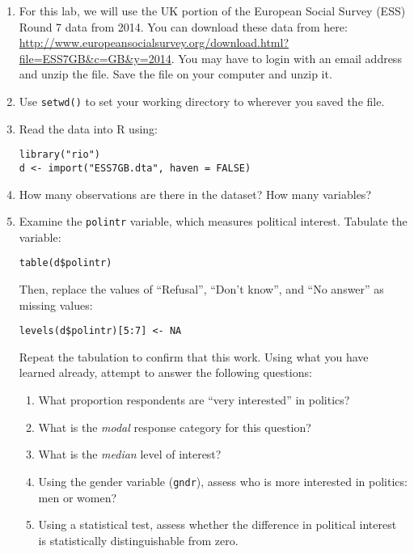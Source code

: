 \documentclass[a4paper,12pt]{article}
\begin{document}
\begin{enumerate}
\item For this lab, we will use the UK portion of the European Social Survey (ESS) Round 7 data from 2014. You can download these data from here: \url{http://www.europeansocialsurvey.org/download.html?file=ESS7GB&c=GB&y=2014}. You may have to login with an email address and unzip the file. Save the file on your computer and unzip it.

\item Use \texttt{setwd()} to set your working directory to wherever you saved the file.

\item Read the data into R using: 

\begin{verbatim}
library("rio")
d <- import("ESS7GB.dta", haven = FALSE)
\end{verbatim}

\item How many observations are there in the dataset? How many variables?

\item Examine the \texttt{polintr} variable, which measures political interest. Tabulate the variable:

\begin{verbatim}
table(d$polintr)
\end{verbatim}

\noindent Then, replace the values of ``Refusal'', ``Don't know'', and ``No answer'' as missing values: 

\begin{verbatim}
levels(d$polintr)[5:7] <- NA
\end{verbatim}

\noindent Repeat the tabulation to confirm that this work. Using what you have learned already, attempt to answer the following questions:

\begin{enumerate}
\item What proportion respondents are ``very interested'' in politics?	
\item What is the \textit{modal} response category for this question?
\item What is the \textit{median} level of interest?
\item Using the gender variable (\texttt{gndr}), assess who is more interested in politics: men or women?
\item Using a statistical test, assess whether the difference in political interest is statistically distinguishable from zero.
\end{enumerate}


\end{enumerate}
\end{document}

